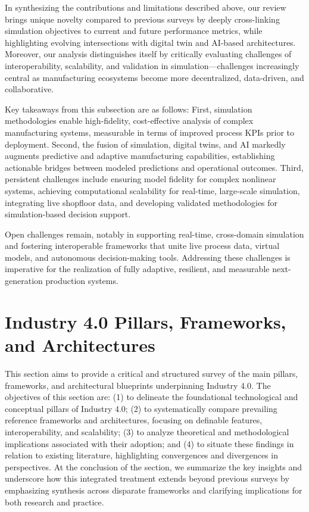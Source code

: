 \documentclass[sigconf]{acmart}
\begin{document}
In synthesizing the contributions and limitations described above, our review brings unique novelty compared to previous surveys by deeply cross-linking simulation objectives to current and future performance metrics, while highlighting evolving intersections with digital twin and AI-based architectures. Moreover, our analysis distinguishes itself by critically evaluating challenges of interoperability, scalability, and validation in simulation---challenges increasingly central as manufacturing ecosystems become more decentralized, data-driven, and collaborative.

Key takeaways from this subsection are as follows: First, simulation methodologies enable high-fidelity, cost-effective analysis of complex manufacturing systems, measurable in terms of improved process KPIs prior to deployment. Second, the fusion of simulation, digital twins, and AI markedly augments predictive and adaptive manufacturing capabilities, establishing actionable bridges between modeled predictions and operational outcomes. Third, persistent challenges include ensuring model fidelity for complex nonlinear systems, achieving computational scalability for real-time, large-scale simulation, integrating live shopfloor data, and developing validated methodologies for simulation-based decision support.

Open challenges remain, notably in supporting real-time, cross-domain simulation and fostering interoperable frameworks that unite live process data, virtual models, and autonomous decision-making tools. Addressing these challenges is imperative for the realization of fully adaptive, resilient, and measurable next-generation production systems.

\section{Industry 4.0 Pillars, Frameworks, and Architectures}

This section aims to provide a critical and structured survey of the main pillars, frameworks, and architectural blueprints underpinning Industry 4.0. The objectives of this section are: (1) to delineate the foundational technological and conceptual pillars of Industry 4.0; (2) to systematically compare prevailing reference frameworks and architectures, focusing on definable features, interoperability, and scalability; (3) to analyze theoretical and methodological implications associated with their adoption; and (4) to situate these findings in relation to existing literature, highlighting convergences and divergences in perspectives. At the conclusion of the section, we summarize the key insights and underscore how this integrated treatment extends beyond previous surveys by emphasizing synthesis across disparate frameworks and clarifying implications for both research and practice.
\end{document}
